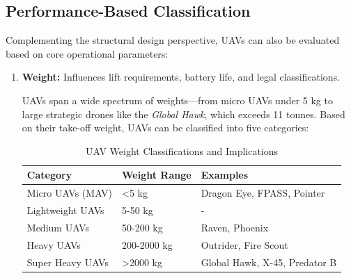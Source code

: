 

\subsection{Performance-Based Classification}

Complementing the structural design perspective, UAVs can also be evaluated based on core operational parameters:

\begin{enumerate}
    \item \textbf{Weight:} Influences lift requirements, battery life, and legal classifications.

    UAVs span a wide spectrum of weights—from micro UAVs under 5 kg to large strategic drones like the \textit{Global Hawk}, which exceeds 11 tonnes. Based on their take-off weight, UAVs can be classified into five categories:


    \begin{table}[h]
        \centering
        \label{tab:uav_weights}
        \begin{tabular}{|l|l|l|}
        \hline
        \textbf{Category} & \textbf{Weight Range} & \textbf{Examples} \\ \hline
        Micro UAVs (MAV) & <5 kg & Dragon Eye, FPASS, Pointer \\ \hline
        Lightweight UAVs & 5-50 kg & - \\ \hline
        Medium UAVs & 50-200 kg & Raven, Phoenix \\ \hline
        Heavy UAVs & 200-2000 kg & Outrider, Fire Scout \\ \hline
        Super Heavy UAVs & >2000 kg & Global Hawk, X-45, Predator B \\ \hline
        \end{tabular}
        \caption{UAV Weight Classifications and Implications}
    \end{table}


\end{enumerate}

